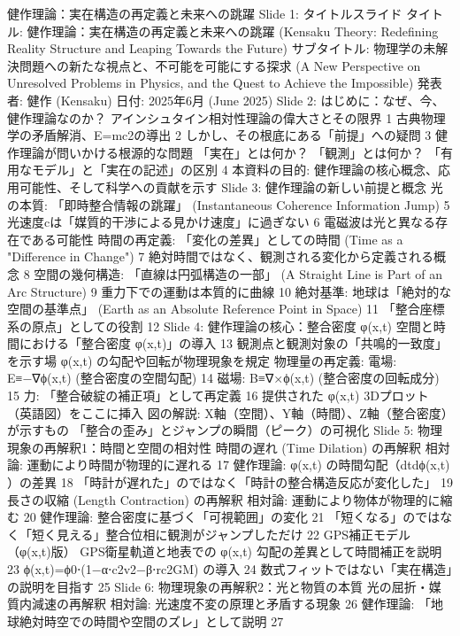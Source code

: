 \documentclass{article}
\begin{document}
健作理論：実在構造の再定義と未来への跳躍
Slide 1: タイトルスライド
タイトル: 健作理論：実在構造の再定義と未来への跳躍 (Kensaku Theory: Redefining Reality Structure and Leaping Towards the Future)
サブタイトル: 物理学の未解決問題への新たな視点と、不可能を可能にする探求 (A New Perspective on Unresolved Problems in Physics, and the Quest to Achieve the Impossible)
発表者: 健作 (Kensaku)
日付: 2025年6月 (June 2025)
Slide 2: はじめに：なぜ、今、健作理論なのか？
アインシュタイン相対性理論の偉大さとその限界 1
古典物理学の矛盾解消、E=mc2の導出 2
しかし、その根底にある「前提」への疑問 3
健作理論が問いかける根源的な問題 
「実在」とは何か？ 「観測」とは何か？
「有用なモデル」と「実在の記述」の区別 4
本資料の目的: 健作理論の核心概念、応用可能性、そして科学への貢献を示す
Slide 3: 健作理論の新しい前提と概念
光の本質: 「即時整合情報の跳躍」 (Instantaneous Coherence Information Jump) 5
光速度cは「媒質的干渉による見かけ速度」に過ぎない 6
電磁波は光と異なる存在である可能性
時間の再定義: 「変化の差異」としての時間 (Time as a "Difference in Change") 7
絶対時間ではなく、観測される変化から定義される概念 8
空間の幾何構造: 「直線は円弧構造の一部」 (A Straight Line is Part of an Arc Structure) 9
重力下での運動は本質的に曲線 10
絶対基準: 地球は「絶対的な空間の基準点」 (Earth as an Absolute Reference Point in Space) 11
「整合座標系の原点」としての役割 12
Slide 4: 健作理論の核心：整合密度 φ(x,t)
空間と時間における「整合密度 φ(x,t)」の導入 13
観測点と観測対象の「共鳴的一致度」を示す場
φ(x,t) の勾配や回転が物理現象を規定
物理量の再定義: 
電場: E≡−∇ϕ(x,t) (整合密度の空間勾配) 14
磁場: B≡∇×ϕ(x,t) (整合密度の回転成分) 15
力: 「整合破綻の補正項」として再定義 16
提供された φ(x,t) 3Dプロット（英語図）をここに挿入 
図の解説: X軸（空間）、Y軸（時間）、Z軸（整合密度）が示すもの
「整合の歪み」とジャンプの瞬間（ピーク）の可視化
Slide 5: 物理現象の再解釈1：時間と空間の相対性
時間の遅れ (Time Dilation) の再解釈 
相対論: 運動により時間が物理的に遅れる 17
健作理論: φ(x,t) の時間勾配（dtdϕ(x,t)​）の差異 18
「時計が遅れた」のではなく「時計の整合構造反応が変化した」 19
長さの収縮 (Length Contraction) の再解釈 
相対論: 運動により物体が物理的に縮む 20
健作理論: 整合密度に基づく「可視範囲」の変化 21
「短くなる」のではなく「短く見える」整合位相に観測がジャンプしただけ 22
GPS補正モデル（φ(x,t)版） 
GPS衛星軌道と地表での φ(x,t) 勾配の差異として時間補正を説明 23
ϕ(x,t)=ϕ0​⋅(1−α⋅c2v2​−β⋅rc2GM​) の導入 24
数式フィットではない「実在構造」の説明を目指す 25
Slide 6: 物理現象の再解釈2：光と物質の本質
光の屈折・媒質内減速の再解釈 
相対論: 光速度不変の原理と矛盾する現象 26
健作理論: 「地球絶対時空での時間や空間のズレ」として説明 27
\end{document}

